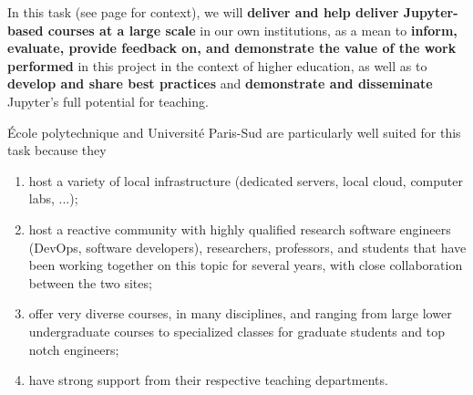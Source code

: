 \begin{task}[
  title=Demonstrator: enriched teaching with Jupyter,
  id=teaching,
  lead=EP,
  PM=5, %
  wphases={1-48},
  partners={EGI,UIO,UPSUD,XFEL}
  ]


  In this task (see page \pageref{sec:concept-demonstrator-teaching}
  for context), we will \textbf{deliver and help deliver Jupyter-based
    courses at a large scale} in our own institutions, as a mean to
  \textbf{inform, evaluate, provide feedback on, and demonstrate the
    value of the work performed} in this project in the context of
  higher education, as well as to \textbf{develop and share best
    practices} and \textbf{demonstrate and disseminate} Jupyter's full
  potential for teaching.

  \'Ecole polytechnique and Université Paris-Sud are particularly well
  suited for this task because they
  \begin{enumerate}
  \item host a variety of local infrastructure (dedicated servers,
    local cloud, computer labs, ...);
  \item host a reactive community with highly qualified research
    software engineers (DevOps, software developers), researchers,
    professors, and students that have been working together on this
    topic for several years, with close collaboration between the two
    sites;
  \item offer very diverse courses, in many disciplines, and ranging
    from large lower undergraduate courses to specialized classes for
    graduate students and top notch engineers;
  \item have strong support from their respective teaching departments.
  \end{enumerate}




\end{task}
